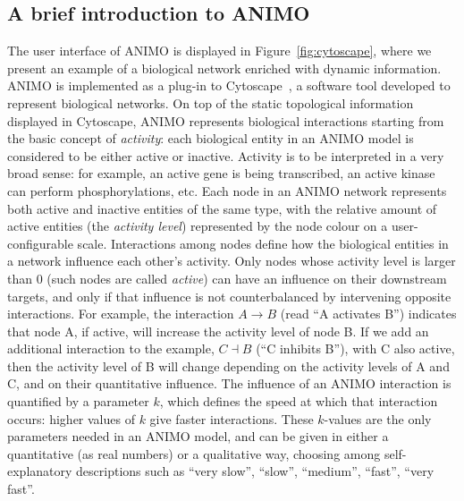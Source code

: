 \documentclass{bmcart}
\begin{document}
\subsection*{A brief introduction to ANIMO}
The user interface of ANIMO is displayed in Figure~\ref{fig:cytoscape},
where we present an example of a biological network enriched with dynamic information.
ANIMO is implemented as a plug-in to Cytoscape~\cite{cytoscape}, a software tool developed to represent biological networks.
On top of the static topological information displayed in Cytoscape, ANIMO represents
biological interactions starting from the basic concept of \emph{activity}:
each biological entity in an ANIMO model is considered to be either active or inactive.
Activity is to be interpreted in a very broad sense: for example, an active gene is being transcribed,
an active kinase can perform phosphorylations, etc. Each node in an ANIMO network represents
both active and inactive entities of the same type, with the relative amount of active entities
(the \emph{activity level}) represented by the node colour on a user-configurable scale.
Interactions among nodes define how the biological entities in a network influence each other's activity.
Only nodes whose activity level is larger than 0 (such nodes are called \emph{active}) can have an 
influence on their downstream targets, and only if that influence is not counterbalanced by intervening opposite interactions.
For example, the interaction $A\rightarrow B$ (read ``A activates B'') indicates that node A, if active,
will increase the activity level of node B. If we add an additional interaction to the example,
$C \dashv$\hspace{0.1em}$B$ (``C inhibits B''), with C also active, then the activity level of B will change depending on the
activity levels of A and C, and on their quantitative influence.
The influence of an ANIMO interaction is quantified by a parameter $k$, which defines the speed at which
that interaction occurs: higher values of $k$ give faster interactions. These $k$-values are
the only parameters needed in an ANIMO model, and can be given in either
a quantitative (as real numbers) or a qualitative way, choosing among self-explanatory descriptions
such as ``very slow'', ``slow'', ``medium'', ``fast'', ``very fast''.
\end{document}
